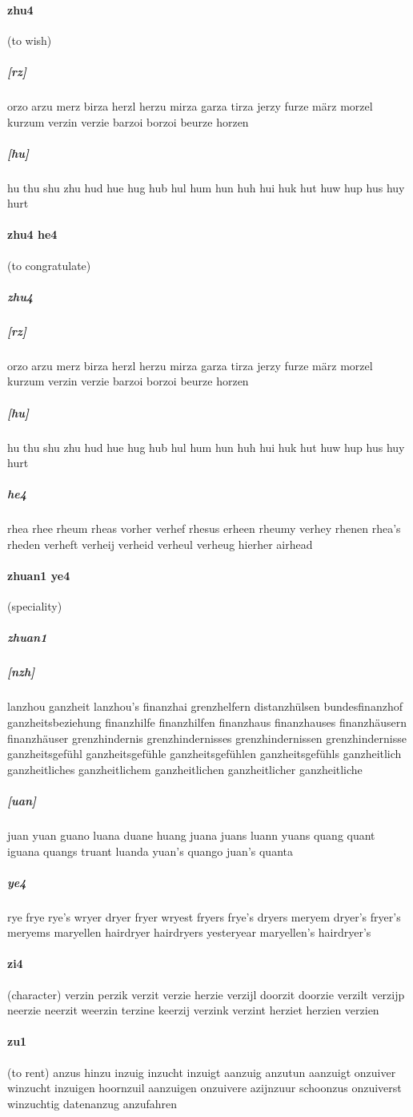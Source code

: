 \documentclass{article}
\begin{document}
\paragraph{zhu4}(to wish) \subparagraph{[rz]}orzo
arzu
merz
birza
herzl
herzu
mirza
garza
tirza
jerzy
furze
märz
morzel
kurzum
verzin
verzie
barzoi
borzoi
beurze
horzen
\subparagraph{[hu]}hu
thu
shu
zhu
hud
hue
hug
hub
hul
hum
hun
huh
hui
huk
hut
huw
hup
hus
huy
hurt
\paragraph{zhu4 he4}(to congratulate) \subparagraph{zhu4}\subparagraph{[rz]}orzo
arzu
merz
birza
herzl
herzu
mirza
garza
tirza
jerzy
furze
märz
morzel
kurzum
verzin
verzie
barzoi
borzoi
beurze
horzen
\subparagraph{[hu]}hu
thu
shu
zhu
hud
hue
hug
hub
hul
hum
hun
huh
hui
huk
hut
huw
hup
hus
huy
hurt
\subparagraph{he4}rhea
rhee
rheum
rheas
vorher
verhef
rhesus
erheen
rheumy
verhey
rhenen
rhea's
rheden
verheft
verheij
verheid
verheul
verheug
hierher
airhead
\paragraph{zhuan1 ye4}(speciality) \subparagraph{zhuan1}\subparagraph{[nzh]}lanzhou
ganzheit
lanzhou's
finanzhai
grenzhelfern
distanzhülsen
bundesfinanzhof
ganzheitsbeziehung
finanzhilfe finanzhilfen
finanzhaus finanzhauses finanzhäusern finanzhäuser
grenzhindernis grenzhindernisses grenzhindernissen grenzhindernisse
ganzheitsgefühl ganzheitsgefühle ganzheitsgefühlen ganzheitsgefühls
ganzheitlich ganzheitliches ganzheitlichem ganzheitlichen ganzheitlicher ganzheitliche
\subparagraph{[uan]}juan
yuan
guano
luana
duane
huang
juana
juans
luann
yuans
quang
quant
iguana
quangs
truant
luanda
yuan's
quango
juan's
quanta
\subparagraph{ye4}rye
frye
rye's
wryer
dryer
fryer
wryest
fryers
frye's
dryers
meryem
dryer's
fryer's
meryems
maryellen
hairdryer
hairdryers
yesteryear
maryellen's
hairdryer's
\paragraph{zi4}(character) verzin
perzik
verzit
verzie
herzie
verzijl
doorzit
doorzie
verzilt
verzijp
neerzie
neerzit
weerzin
terzine
keerzij
verzink
verzint
herziet
herzien
verzien
\paragraph{zu1}(to rent) anzus
hinzu
inzuig
inzucht
inzuigt
aanzuig
anzutun
aanzuigt
onzuiver
winzucht
inzuigen
hoornzuil
aanzuigen
onzuivere
azijnzuur
schoonzus
onzuiverst
winzuchtig
datenanzug
anzufahren
\end{document}
